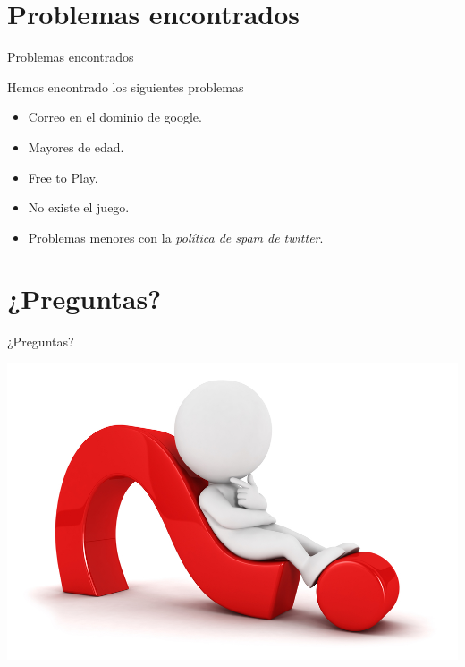 \documentclass{beamer}
\begin{document}
\section{Problemas encontrados}
\begin{frame}{Problemas encontrados}
	\begin{alertblock}{Hemos encontrado los siguientes problemas}
		\begin{itemize}
			\item Correo en el dominio de google.
			\item Mayores de edad.
			\item Free to Play.
			\item No existe el juego.
			\item Problemas menores con la \href{https://help.twitter.com/en/rules-and-policies/twitter-automation}{\textit{política de spam de twitter}}.
		\end{itemize}
	\end{alertblock}
\end{frame}

\section{¿Preguntas?}
\begin{frame}{¿Preguntas?}
\begin{center}
	\includegraphics[scale=1.3]{dudasTumbado.jpg}
\end{center}

\end{frame}
\end{document}
